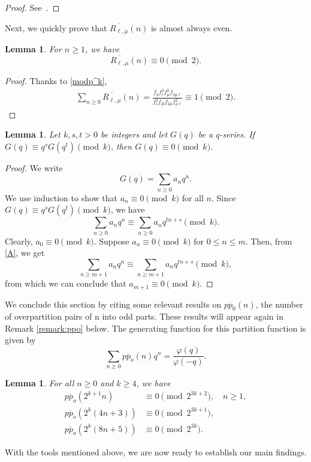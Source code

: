 \documentclass{amsart}
\newtheorem{lemma}[theorem]{Lemma}
\theoremstyle{definition}
\begin{document}
\begin{proof}
See~\cite[Lemma~3]{daSilva-Sellers}.
\end{proof}
Next, we quickly prove that $\overline{R_{\ell,\mu}}(n)$ is almost always even.
\begin{lemma} For $n\geq 1$, we have 
    \begin{equation} \label{Tlu02}
       \overline{R_{\ell,\mu}}(n)\equiv0\pmod{2}.
    \end{equation}
\end{lemma}
\begin{proof} Thanks to \eqref{modp^k},
    \begin{align*}
        \sum_{n\geq 0}\overline{R_{\ell,\mu}}(n)=\frac{f_2f_\ell^2f_\mu^2f_{2\mu\ell}}{f_1^2f_{2l}f_{2\mu}f_{\mu\ell}^2}\equiv 1\pmod{2}.
    \end{align*} \end{proof}

\begin{lemma}\label{Gq=qGq}
   Let $k,s,t>0$ be integers and let $G(q)$ be a $q$-series. If $G(q)\equiv q^sG(q^t)\pmod{k}$, then $G(q)\equiv 0\pmod{k}$.
\end{lemma}
\begin{proof}
    We write
    \begin{equation*}
        G(q)=\sum_{n\geq0}a_nq^n.
    \end{equation*}
We use induction to show that $a_n\equiv0\pmod{k}$ for all $n$. Since $G(q)\equiv q^sG(q^t)\pmod{k}$, we have
\begin{equation}\label{A}
\sum_{n\geq0}a_nq^n\equiv\sum_{n\geq0}a_nq^{tn+s}\pmod{k}.
    \end{equation}
Clearly, $a_0\equiv0\pmod{k}$. Suppose $a_n\equiv0\pmod k$ for $0\leq n\leq m$. Then, from \eqref{A}, we get
\begin{equation*}
\sum_{n\geq m+1}a_nq^n\equiv\sum_{n\geq m+1}a_nq^{tn+s}\pmod{k},
    \end{equation*}
from which we can conclude that $a_{m+1}\equiv0\pmod{k}$.
\end{proof}

We conclude this section by citing some relevant results on $\overline{pp_0}(n)$, the number of overpartition pairs of n into odd parts. These results will appear again in Remark \ref{remark:ppo} below. 
The generating function for this partition function is given by
\begin{equation}\label{pponvarphi}
    \sum_{n\geq0}\overline{pp_o}(n)q^n=\frac{\varphi(q)}{\varphi(-q)}.
\end{equation}
\begin{lemma}\cite[Theorem 1.2]{Adiga-Dasappa}\label{ppo2^k}
    For all $n\geq 0$ and $k\geq4$, we have 
    \begin{align*}
        \overline{pp_o}(2^{k+1}n)&\equiv0\pmod{2^{3k+2}}, \quad n\geq1,\\
        \overline{pp_o}(2^k(4n+3))&\equiv0\pmod{2^{3k+1}},\\
        \overline{pp_o}(2^k(8n+5))&\equiv0\pmod{2^{3k}}.
    \end{align*}
\end{lemma}
With the tools mentioned above, we are now ready to establish our main findings.
\end{document}
